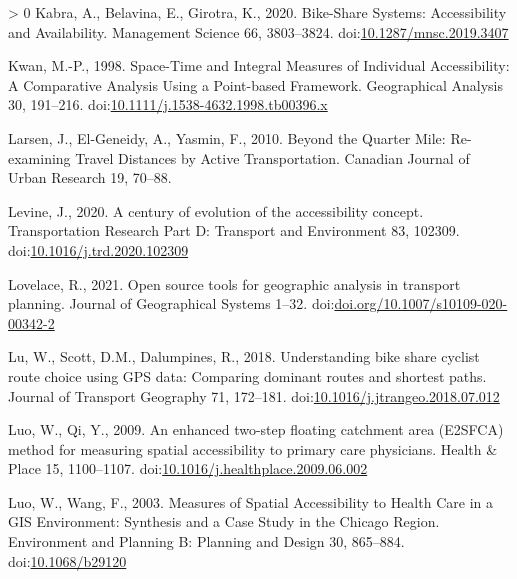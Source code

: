 \documentclass[]{elsarticle} %
\newlength{\cslhangindent}
\newenvironment{CSLReferences}[3] %
 {%
  \setlength{\parindent}{0pt}
  \ifodd #1 \everypar{\setlength{\hangindent}{\cslhangindent}}\ignorespaces\fi
  \ifnum #2 > 0
  \setlength{\parskip}{#2\baselineskip}
  \fi
 }%
 {}
\begin{document}
\begin{CSLReferences}{1}{0}
\leavevmode\hypertarget{ref-kabraBikeShareSystemsAccessibility2020}{}%
Kabra, A., Belavina, E., Girotra, K., 2020. Bike-{Share Systems}:
{Accessibility} and {Availability}. Management Science 66, 3803--3824.
doi:\href{https://doi.org/10.1287/mnsc.2019.3407}{10.1287/mnsc.2019.3407}

\leavevmode\hypertarget{ref-kwanSpaceTimeIntegral1998}{}%
Kwan, M.-P., 1998. Space-{Time} and {Integral Measures} of {Individual
Accessibility}: {A Comparative Analysis Using} a {Point}-based
{Framework}. Geographical Analysis 30, 191--216.
doi:\href{https://doi.org/10.1111/j.1538-4632.1998.tb00396.x}{10.1111/j.1538-4632.1998.tb00396.x}

\leavevmode\hypertarget{ref-larsenQuarterMileReexamining2010}{}%
Larsen, J., El-Geneidy, A., Yasmin, F., 2010. Beyond the {Quarter Mile}:
{Re}-examining {Travel Distances} by {Active Transportation}. Canadian
Journal of Urban Research 19, 70--88.

\leavevmode\hypertarget{ref-levineCenturyEvolutionAccessibility2020}{}%
Levine, J., 2020. A century of evolution of the accessibility concept.
Transportation Research Part D: Transport and Environment 83, 102309.
doi:\href{https://doi.org/10.1016/j.trd.2020.102309}{10.1016/j.trd.2020.102309}

\leavevmode\hypertarget{ref-lovelace2021open}{}%
Lovelace, R., 2021. Open source tools for geographic analysis in
transport planning. Journal of Geographical Systems 1--32.
doi:\href{https://doi.org/doi.org/10.1007/s10109-020-00342-2}{doi.org/10.1007/s10109-020-00342-2}

\leavevmode\hypertarget{ref-luUnderstandingBikeShare2018}{}%
Lu, W., Scott, D.M., Dalumpines, R., 2018. Understanding bike share
cyclist route choice using {GPS} data: {Comparing} dominant routes and
shortest paths. Journal of Transport Geography 71, 172--181.
doi:\href{https://doi.org/10.1016/j.jtrangeo.2018.07.012}{10.1016/j.jtrangeo.2018.07.012}

\leavevmode\hypertarget{ref-luoEnhancedTwostepFloating2009}{}%
Luo, W., Qi, Y., 2009. An enhanced two-step floating catchment area
({E2SFCA}) method for measuring spatial accessibility to primary care
physicians. Health \& Place 15, 1100--1107.
doi:\href{https://doi.org/10.1016/j.healthplace.2009.06.002}{10.1016/j.healthplace.2009.06.002}

\leavevmode\hypertarget{ref-luoMeasuresSpatialAccessibility2003}{}%
Luo, W., Wang, F., 2003. Measures of {Spatial Accessibility} to {Health
Care} in a {GIS Environment}: {Synthesis} and a {Case Study} in the
{Chicago Region}. Environment and Planning B: Planning and Design 30,
865--884. doi:\href{https://doi.org/10.1068/b29120}{10.1068/b29120}


\end{CSLReferences}
\end{document}
